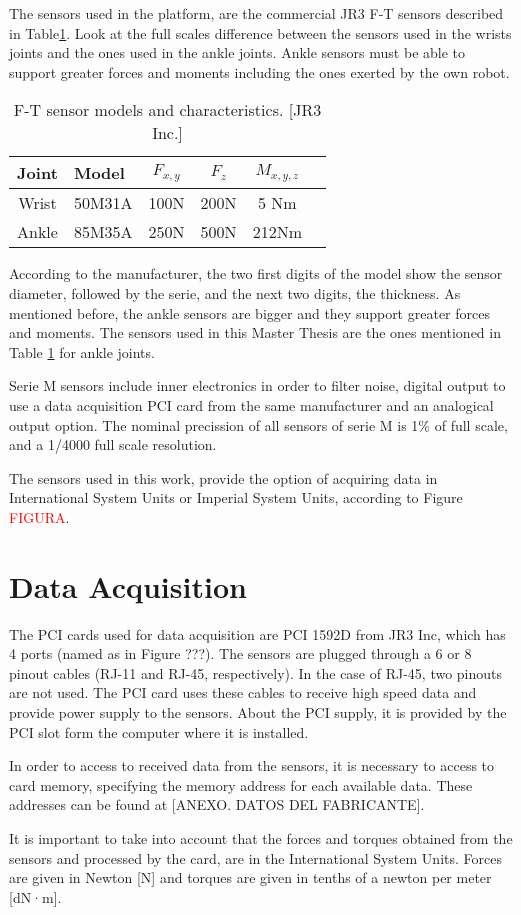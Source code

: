 The sensors used in the platform, are the commercial JR3 F-T sensors described in Table\ref{table:sensores}. Look at the full scales difference between the sensors used in the wrists joints and the ones used in the ankle joints. Ankle sensors must be able to support greater forces and moments including the ones exerted by the own robot.

\begin{table}[!hbt]
\centering
\begin{tabular}{|cl|c|c|c|c|}
\hline
Joint & Model & $F_{x,y}$ & $F_z$ & $M_{x,y,z}$\\
\hline
Wrist & 50M31A & 100N & 200N & 5 Nm\\ 
\hline
Ankle & 85M35A & 250N & 500N & 212Nm\\
\hline
\end{tabular}
\caption{F-T sensor models and characteristics. [JR3 Inc.]}
\label{table:sensores}
\end{table}

According to the manufacturer, the two first digits of the model show the sensor diameter, followed by the serie, and the next two digits, the thickness. As mentioned before, the ankle sensors are bigger and they support greater forces and moments. The sensors used in this Master Thesis are the ones mentioned in Table \ref{table:sensores} for ankle joints.

Serie M sensors include inner electronics in order to filter noise, digital output to use a data acquisition PCI card from the same manufacturer and an analogical output option. The nominal precission of all sensors of serie M is 1\% of full scale, and a 1/4000 full scale resolution.

The sensors used in this work, provide the option of acquiring data in International System Units or Imperial System Units, according to Figure \textcolor{red}{FIGURA}.

\section{Data Acquisition}
The PCI cards used for data acquisition are PCI 1592D from JR3 Inc, which has 4 ports (named as in Figure ???). The sensors are plugged through a 6 or 8 pinout cables (RJ-11 and RJ-45, respectively). In the case of RJ-45, two pinouts are not used. The PCI card uses these cables to receive high speed data and provide power supply to the sensors. About the PCI supply, it is provided by the PCI slot form the computer where it is installed.

In order to access to received data from the sensors, it is necessary to access to card memory, specifying the memory address for each available data. These addresses can be found at [ANEXO. DATOS DEL FABRICANTE].

It is important to take into account that the forces and torques obtained from the sensors and processed by the card, are in the International System Units. Forces are given in Newton [N] and torques are given in tenths of a newton per meter [dN·m].